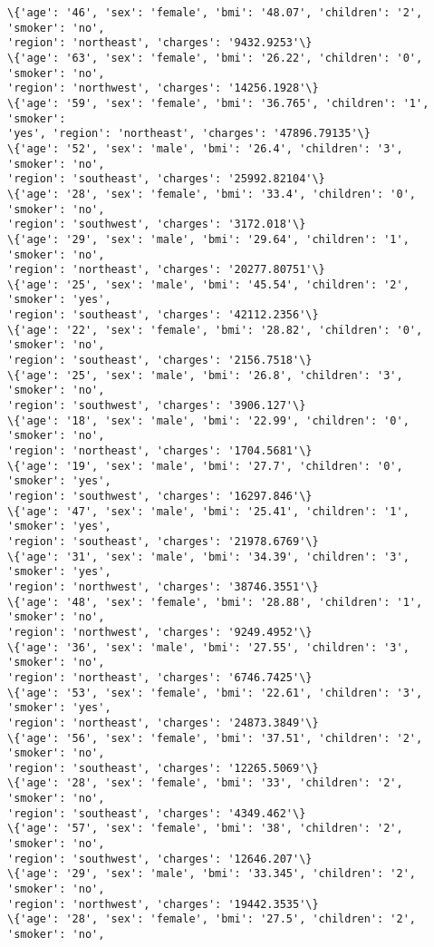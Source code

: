 \documentclass[11pt]{article}
\begin{document}
\begin{Verbatim}[commandchars=\\\{\}]
\{'age': '46', 'sex': 'female', 'bmi': '48.07', 'children': '2', 'smoker': 'no',
'region': 'northeast', 'charges': '9432.9253'\}
\{'age': '63', 'sex': 'female', 'bmi': '26.22', 'children': '0', 'smoker': 'no',
'region': 'northwest', 'charges': '14256.1928'\}
\{'age': '59', 'sex': 'female', 'bmi': '36.765', 'children': '1', 'smoker':
'yes', 'region': 'northeast', 'charges': '47896.79135'\}
\{'age': '52', 'sex': 'male', 'bmi': '26.4', 'children': '3', 'smoker': 'no',
'region': 'southeast', 'charges': '25992.82104'\}
\{'age': '28', 'sex': 'female', 'bmi': '33.4', 'children': '0', 'smoker': 'no',
'region': 'southwest', 'charges': '3172.018'\}
\{'age': '29', 'sex': 'male', 'bmi': '29.64', 'children': '1', 'smoker': 'no',
'region': 'northeast', 'charges': '20277.80751'\}
\{'age': '25', 'sex': 'male', 'bmi': '45.54', 'children': '2', 'smoker': 'yes',
'region': 'southeast', 'charges': '42112.2356'\}
\{'age': '22', 'sex': 'female', 'bmi': '28.82', 'children': '0', 'smoker': 'no',
'region': 'southeast', 'charges': '2156.7518'\}
\{'age': '25', 'sex': 'male', 'bmi': '26.8', 'children': '3', 'smoker': 'no',
'region': 'southwest', 'charges': '3906.127'\}
\{'age': '18', 'sex': 'male', 'bmi': '22.99', 'children': '0', 'smoker': 'no',
'region': 'northeast', 'charges': '1704.5681'\}
\{'age': '19', 'sex': 'male', 'bmi': '27.7', 'children': '0', 'smoker': 'yes',
'region': 'southwest', 'charges': '16297.846'\}
\{'age': '47', 'sex': 'male', 'bmi': '25.41', 'children': '1', 'smoker': 'yes',
'region': 'southeast', 'charges': '21978.6769'\}
\{'age': '31', 'sex': 'male', 'bmi': '34.39', 'children': '3', 'smoker': 'yes',
'region': 'northwest', 'charges': '38746.3551'\}
\{'age': '48', 'sex': 'female', 'bmi': '28.88', 'children': '1', 'smoker': 'no',
'region': 'northwest', 'charges': '9249.4952'\}
\{'age': '36', 'sex': 'male', 'bmi': '27.55', 'children': '3', 'smoker': 'no',
'region': 'northeast', 'charges': '6746.7425'\}
\{'age': '53', 'sex': 'female', 'bmi': '22.61', 'children': '3', 'smoker': 'yes',
'region': 'northeast', 'charges': '24873.3849'\}
\{'age': '56', 'sex': 'female', 'bmi': '37.51', 'children': '2', 'smoker': 'no',
'region': 'southeast', 'charges': '12265.5069'\}
\{'age': '28', 'sex': 'female', 'bmi': '33', 'children': '2', 'smoker': 'no',
'region': 'southeast', 'charges': '4349.462'\}
\{'age': '57', 'sex': 'female', 'bmi': '38', 'children': '2', 'smoker': 'no',
'region': 'southwest', 'charges': '12646.207'\}
\{'age': '29', 'sex': 'male', 'bmi': '33.345', 'children': '2', 'smoker': 'no',
'region': 'northwest', 'charges': '19442.3535'\}
\{'age': '28', 'sex': 'female', 'bmi': '27.5', 'children': '2', 'smoker': 'no',

\end{Verbatim}
\end{document}
